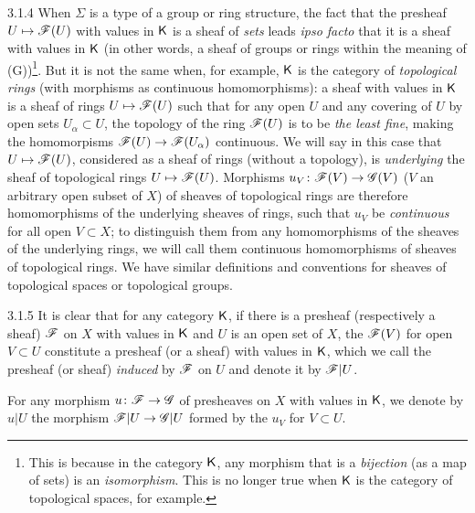 \documentclass{book}
\begin{document}
\begin{env}{3.1.4}
\label{env-0.3.1.4}
When $\Sigma$ is a type of a group or ring structure, the fact that
the presheaf $U\mapsto\mathscr{F}(U)$ with values in $\mathsf{K}$ is a sheaf of \emph{sets} leads \emph{ipso facto}
that it is a sheaf with values in $\mathsf{K}$ (in other words, a sheaf of groups or rings
within the meaning of (G))\footnote{This is because in the category $\mathsf{K}$, any morphism that is a
\emph{bijection} (as a map of sets) is an \emph{isomorphism}. This is no longer true when $\mathsf{K}$
is the category of topological spaces, for example.}. But it is not the same when, for example,
$\mathsf{K}$ is the category of \emph{topological rings} (with morphisms as continuous homomorphisms): a sheaf
with values in $\mathsf{K}$ is a sheaf of rings $U\mapsto\mathscr{F}(U)$ such that for any open $U$
and any covering of $U$ by open sets $U_\alpha\subset U$, the topology of the ring $\mathscr{F}(U)$
is to be \emph{the least fine}, making the homomorpisms $\mathscr{F}(U)\to\mathscr{F}(U_\alpha)$ continuous. We will say in
this case that $U\mapsto\mathscr{F}(U)$, considered as a sheaf of rings (without a topology), is
\emph{underlying} the sheaf of topological rings $U\mapsto\mathscr{F}(U)$. Morphisms $u_V\colon\mathscr{F}(V)\to\mathscr{G}(V)$
($V$ an arbitrary open subset of $X$) of sheaves of topological rings are therefore homomorphisms of the
underlying sheaves of rings, such that $u_V$ be \emph{continuous} for all
open $V\subset X$; to distinguish them from any homomorphisms of the sheaves
of the underlying rings, we will call them continuous homomorphisms of sheaves of topological rings.
We have similar definitions and conventions for sheaves of topological spaces or topological groups.
\end{env}

\begin{env}{3.1.5}
\label{env-0.3.1.5}
It is clear that for any category $\mathsf{K}$, if there is a presheaf (respectively a
sheaf) $\mathscr{F}$ on $X$ with values in $\mathsf{K}$ and $U$ is an open set of $X$, the $\mathscr{F}(V)$ for
open $V\subset U$ constitute a presheaf (or a sheaf) with values in $\mathsf{K}$, which we call
the presheaf (or sheaf) \emph{induced} by $\mathscr{F}$ on $U$ and denote it by $\mathscr{F}|U$.

For any morphism $u\colon\mathscr{F}\to\mathscr{G}$ of presheaves on $X$ with values in $\mathsf{K}$, we
denote by $u|U$ the morphism $\mathscr{F}|U\to\mathscr{G}|U$ formed by the $u_V$ for $V\subset U$.
\end{env}
\end{document}
